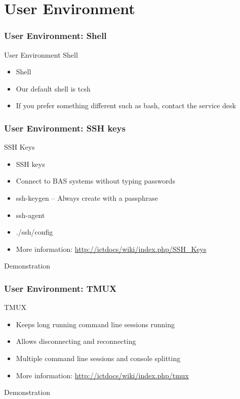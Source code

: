 \part{User Environment}
\frame{\partpage}

{
\section{User Environment: Shell}
%
\begin{frame}{User Environment}
\text Shell
\begin{itemize}
\item Shell
\item Our default shell is tcsh
\item If you prefer something different such as bash, contact the service desk
\end{itemize}
\end{frame}
}

{
\section{User Environment: SSH keys}
%
\begin{frame}{SSH Keys}
\begin{itemize}
\item SSH keys
\item Connect to BAS systems without typing passwords
\item ssh-keygen – Always create with a passphrase
\item ssh-agent
\item ./ssh/config
\item More information: \href{http://ictdocs/wiki/index.php/SSH\_Keys}{http://ictdocs/wiki/index.php/SSH_Keys}  
\end{itemize}
\item{{\color{red}Demonstration}}
\end{frame}
}

{
\section{User Environment: TMUX}
%
\begin{frame}{TMUX}
\begin{itemize}
\item Keeps long running command line sessions running
\item Allows disconnecting and reconnecting
\item Multiple command line sessions and console splitting
\item More information: \href{http://ictdocs/wiki/index.php/tmux}{http://ictdocs/wiki/index.php/tmux}
\end{itemize}
\item{{\color{red}Demonstration}}
\end{frame}
}

